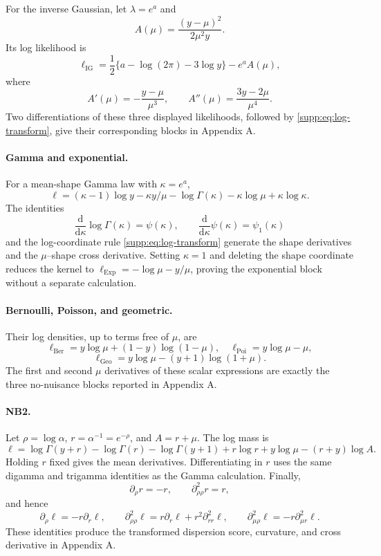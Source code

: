 \documentclass[a4paper,fleqn]{cas-sc}
\numberwithin{equation}{section}
\begin{document}
For the inverse Gaussian, let $\lambda=e^a$ and
\[
 A(\mu)=\frac{(y-\mu)^2}{2\mu^2y}.
\]
Its log likelihood is
\[
 \ell_{\mathrm{IG}}
 =\frac12\{a-\log(2\pi)-3\log y\}-e^aA(\mu),
\]
where
\[
 A'(\mu)=-\frac{y-\mu}{\mu^3},\qquad
 A''(\mu)=\frac{3y-2\mu}{\mu^4}.
\]
Two differentiations of these three displayed likelihoods, followed by
\eqref{supp:eq:log-transform}, give their corresponding blocks in Appendix A.

\paragraph{Gamma and exponential.}
For a mean-shape Gamma law with $\kappa=e^a$,
\[
 \ell=(\kappa-1)\log y-\kappa y/\mu-\log\Gamma(\kappa)
 -\kappa\log\mu+\kappa\log\kappa.
\]
The identities
\[
 \frac{\mathrm d}{\mathrm d\kappa}\log\Gamma(\kappa)=\psi(\kappa),
 \qquad
 \frac{\mathrm d}{\mathrm d\kappa}\psi(\kappa)=\psi_1(\kappa)
\]
and the log-coordinate rule \eqref{supp:eq:log-transform} generate the shape derivatives and the $\mu$--shape cross derivative. Setting $\kappa=1$ and deleting the shape coordinate reduces the kernel to
$\ell_{\mathrm{Exp}}=-\log\mu-y/\mu$, proving the exponential block without a separate calculation.

\paragraph{Bernoulli, Poisson, and geometric.}
Their log densities, up to terms free of $\mu$, are
\[
 \ell_{\mathrm{Ber}}=y\log\mu+(1-y)\log(1-\mu),\quad
 \ell_{\mathrm{Poi}}=y\log\mu-\mu,
\]
\[
 \ell_{\mathrm{Geo}}=y\log\mu-(y+1)\log(1+\mu).
\]
The first and second $\mu$ derivatives of these scalar expressions are exactly the three no-nuisance blocks reported in Appendix A.

\paragraph{NB2.}
Let $\rho=\log\alpha$, $r=\alpha^{-1}=e^{-\rho}$, and $A=r+\mu$. The log mass is
\[
 \ell=\log\Gamma(y+r)-\log\Gamma(r)-\log\Gamma(y+1)
 +r\log r+y\log\mu-(r+y)\log A.
\]
Holding $r$ fixed gives the mean derivatives. Differentiating in $r$ uses the same digamma and trigamma identities as the Gamma calculation. Finally,
\[
 \partial_\rho r=-r,\qquad \partial_{\rho\rho}^2r=r,
\]
and hence
\[
 \partial_\rho\ell=-r\partial_r\ell,\qquad
 \partial_{\rho\rho}^2\ell=r\partial_r\ell+r^2\partial_{rr}^2\ell,
 \qquad \partial_{\mu\rho}^2\ell=-r\partial_{\mu r}^2\ell.
\]
These identities produce the transformed dispersion score, curvature, and cross derivative in Appendix A.
\end{document}
